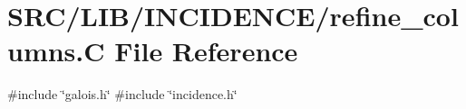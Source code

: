 \hypertarget{refine__columns_8_c}{}\section{S\+R\+C/\+L\+I\+B/\+I\+N\+C\+I\+D\+E\+N\+C\+E/refine\+\_\+columns.C File Reference}
\label{refine__columns_8_c}
{\ttfamily \#include \char`\"{}galois.\+h\char`\"{}}\newline
{\ttfamily \#include \char`\"{}incidence.\+h\char`\"{}}\newline
